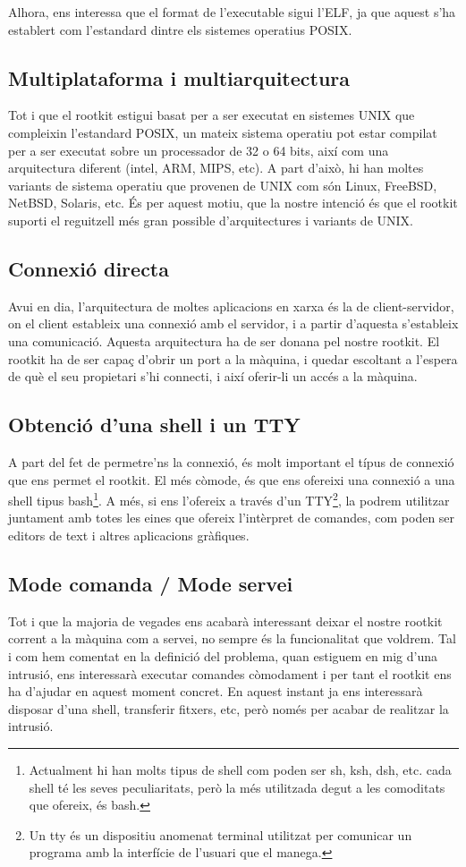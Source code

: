 Alhora, ens interessa que el format de l'executable sigui l'ELF, ja que aquest s'ha establert com l'estandard dintre
els sistemes operatius POSIX.

\subsection{Multiplataforma i multiarquitectura}
Tot i que el rootkit estigui basat per a ser executat en sistemes UNIX que compleixin l'estandard POSIX, un mateix sistema 
operatiu pot estar compilat per a ser executat sobre un processador de 32 o 64 bits, així com una arquitectura diferent
(intel, ARM, MIPS, etc). A part d'això, hi han moltes variants de sistema operatiu que provenen de UNIX com són  Linux, 
FreeBSD, NetBSD, Solaris, etc. És per aquest motiu, que la nostre intenció és que el rootkit suporti el reguitzell més gran 
possible d'arquitectures i variants de UNIX.

\subsection{Connexió directa}
Avui en dia, l'arquitectura de moltes aplicacions en xarxa és la de client-servidor, on el client estableix una connexió
amb el servidor, i a partir d'aquesta s'estableix una comunicació. Aquesta arquitectura ha de ser donana pel nostre rootkit. 
El rootkit ha de ser capaç d'obrir un port a la màquina, i quedar escoltant a l'espera de què el seu propietari s'hi connecti,
i així oferir-li un accés a la màquina.

\subsection{Obtenció d'una shell i un TTY}
A part del fet de permetre'ns la connexió, és molt important el típus de connexió que ens permet el rootkit. El més còmode, és que ens
ofereixi una connexió a una shell tipus bash\footnote{Actualment hi han molts tipus de shell com poden ser sh, ksh, dsh, etc. cada shell té les seves peculiaritats, però la més utilitzada degut a les comoditats que ofereix, és bash.}. A més, si ens l'ofereix a través d'un TTY\footnote{Un tty és un dispositiu anomenat terminal utilitzat per comunicar un programa amb la interfície de l'usuari que el manega.}, la podrem utilitzar juntament amb totes les eines
que ofereix l'intèrpret de comandes, com poden ser editors de text i altres aplicacions gràfiques.

\subsection{Mode comanda / Mode servei}
Tot i que la majoria de vegades ens acabarà interessant deixar el nostre rootkit corrent a la màquina com a servei, no sempre
és la funcionalitat que voldrem. Tal i com hem comentat en la definició del problema, quan estiguem en mig d'una intrusió, ens interessarà
executar comandes còmodament i per tant el rootkit ens ha d'ajudar en aquest moment concret. En aquest instant ja ens interessarà 
disposar d'una shell, transferir fitxers, etc, però només per acabar de realitzar la intrusió.

